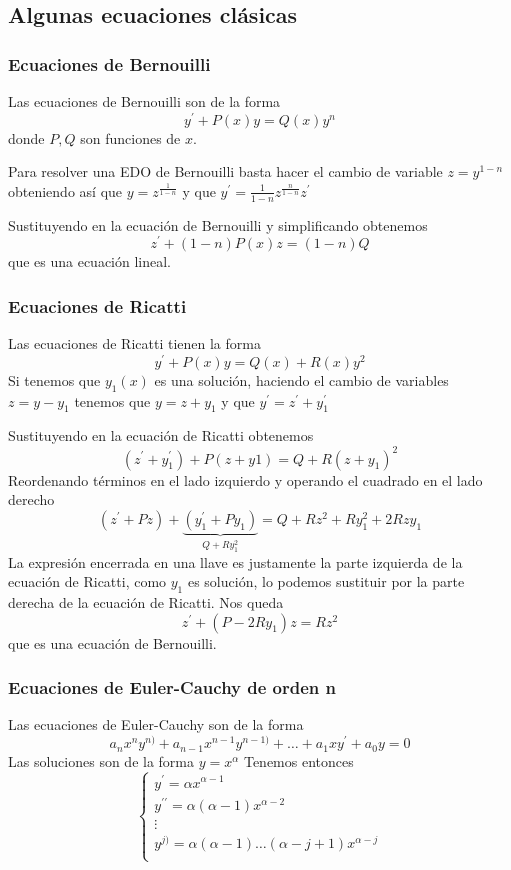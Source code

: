\documentclass{mathnotes}
\begin{document}
\subsection{Algunas ecuaciones clásicas}
\subsubsection{Ecuaciones de Bernouilli}
Las ecuaciones de Bernouilli son de la forma $$y^\prime + P(x)y=Q(x)y^n$$ donde $P,Q$ son funciones de $x$.

\begin{method}
Para resolver una EDO de Bernouilli basta hacer el cambio de variable $z=y^{1-n}$ obteniendo así que $y=z^{\frac{1}{1-n}}$ y que $y^\prime = \frac{1}{1-n}z^{\frac{n}{1-n}}z^\prime$

Sustituyendo en la ecuación de Bernouilli y simplificando obtenemos
$$z^\prime+(1-n)P(x)z=(1-n)Q$$ que es una ecuación lineal.
\end{method}

\subsubsection{Ecuaciones de Ricatti}
Las ecuaciones de Ricatti tienen la forma $$y^\prime +P(x)y=Q(x) + R(x)y^2$$
Si tenemos que $y_1(x)$ es una solución, haciendo el cambio de variables $z=y-y_1$ tenemos que $y=z+y_1$ y que $y^\prime=z^\prime+y_1^\prime$

Sustituyendo en la ecuación de Ricatti obtenemos
$$(z^\prime+y_1^\prime)+P(z+y1) = Q + R(z+y_1)^2$$
Reordenando términos en el lado izquierdo y operando el cuadrado en el lado derecho
$$(z^\prime+Pz)+\underbrace{(y_1^\prime+Py_1)}_{Q+Ry_1^2} = Q+Rz^2+Ry_1^2+2Rzy_1$$
La expresión encerrada en una llave es justamente la parte izquierda de la ecuación de Ricatti, como $y_1$ es solución, lo podemos sustituir por la parte derecha de la ecuación de Ricatti. Nos queda
$$z^\prime+(P-2Ry_1)z=Rz^2$$
que es una ecuación de Bernouilli.

\subsubsection{Ecuaciones de Euler-Cauchy de orden n}
Las ecuaciones de Euler-Cauchy son de la forma 
$$a_nx^ny^{n)}+a_{n-1}x^{n-1}y^{n-1)}+\hdots+a_1xy^\prime+a_0y=0$$
Las soluciones son de la forma $y=x^\alpha$
Tenemos entonces 
\begin{equation*}
  \left\lbrace
  \begin{array}{l}
     y^\prime = \alpha x^{\alpha-1}\\
     y^{\prime\prime} = \alpha(\alpha-1)x^{\alpha-2}\\
     \vdots\\
     y^{j)}=\alpha(\alpha-1)\hdots(\alpha-j+1)x^{\alpha-j}\\
  \end{array}
  \right.
\end{equation*}
\end{document}
